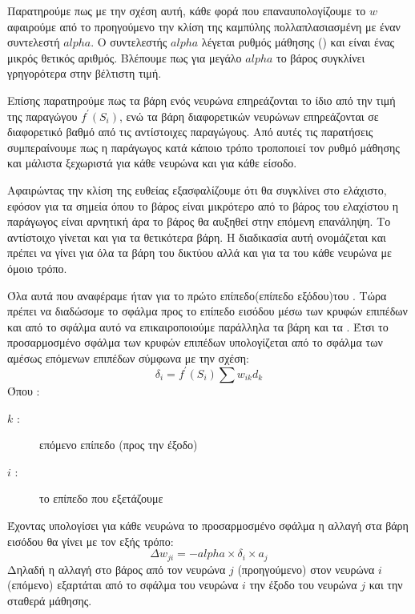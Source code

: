Παρατηρούμε πως με την σχέση αυτή, κάθε φορά που επαναυπολογίζουμε το $w$ αφαιρούμε
από το προηγούμενο την κλίση της καμπύλης πολλαπλασιασμένη με έναν συντελεστή $alpha$.
Ο συντελεστής $alpha$ λέγεται ρυθμός μάθησης () και είναι ένας μικρός θετικός
αριθμός. Βλέπουμε πως για μεγάλο $alpha$ το βάρος συγκλίνει γρηγορότερα στην βέλτιστη
τιμή.

Επίσης παρατηρούμε πως τα βάρη ενός νευρώνα επηρεάζονται το ίδιο από την τιμή της
παραγώγου $f^\prime (S_i)$, ενώ τα βάρη διαφορετικών νευρώνων επηρεάζονται σε διαφορετικό
βαθμό από τις αντίστοιχες παραγώγους. Από αυτές τις παρατήσεις συμπεραίνουμε πως η
παράγωγος κατά κάποιο τρόπο τροποποιεί τον ρυθμό μάθησης και μάλιστα ξεχωριστά για
κάθε νευρώνα και για κάθε είσοδο.

Αφαιρώντας την κλίση της ευθείας εξασφαλίζουμε ότι θα
συγκλίνει στο ελάχιστο, εφόσον για τα σημεία όπου το βάρος είναι μικρότερο από το βάρος
του ελαχίστου η παράγωγος είναι αρνητική άρα το βάρος θα αυξηθεί στην επόμενη
επανάληψη. Το αντίστοιχο γίνεται και για τα θετικότερα βάρη. Η διαδικασία αυτή ονομάζεται
 και πρέπει να γίνει για όλα τα βάρη του δικτύου αλλά και για τα  του
κάθε νευρώνα με όμοιο τρόπο.

Όλα αυτά που αναφέραμε ήταν για το πρώτο επίπεδο(επίπεδο εξόδου)του .
Τώρα πρέπει να διαδώσομε το σφάλμα προς το επίπεδο εισόδου μέσω των κρυφών επιπέδων
και από το σφάλμα αυτό να επικαιροποιούμε παράλληλα τα βάρη και τα . Έτσι το
προσαρμοσμένο σφάλμα των κρυφών επιπέδων υπολογίζεται από το σφάλμα των αμέσως
επόμενων επιπέδων σύμφωνα με την σχέση:
$$\delta _i=f^\prime (S_i)\sum w_{ik}d_k$$
Όπου :
\begin{description}
    \item[$k$ :]  επόμενο επίπεδο (προς την έξοδο)
    \item[$i$ :] το επίπεδο που εξετάζουμε
\end{description}
Έχοντας υπολογίσει για κάθε νευρώνα το προσαρμοσμένο σφάλμα η αλλαγή στα βάρη
εισόδου θα γίνει με τον εξής τρόπο:
$$\Delta w_{ji}=-alpha\times \delta _i\times a_j$$
Δηλαδή η αλλαγή στο βάρος από τον νευρώνα $j$ (προηγούμενο) στον νευρώνα $i$ (επόμενο)
εξαρτάται από το σφάλμα του νευρώνα $i$ την έξοδο του νευρώνα $j$ και την σταθερά μάθησης.
